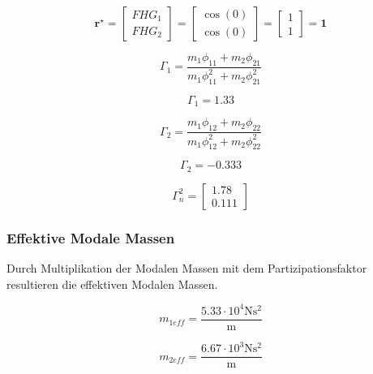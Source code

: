 \documentclass[
  letterpaper,
  DIV=11]{scrreprt}
\begin{document}
\[\mathbf{r^\star} = \begin{bmatrix}
FHG_1 \\
FHG_2 
\end{bmatrix}=
\begin{bmatrix}
\cos(0) \\
\cos(0) 
\end{bmatrix}=
\begin{bmatrix}
1 \\
1 
\end{bmatrix}= \mathbf{1}\]

\begin{equation*}\Gamma_{1} = \frac{m_{1} \phi_{11} + m_{2} \phi_{21}}{m_{1} \phi_{11}^{2} + m_{2} \phi_{21}^{2}}\end{equation*}

\begin{equation*}\Gamma_{1} = 1.33\end{equation*}

\begin{equation*}\Gamma_{2} = \frac{m_{1} \phi_{12} + m_{2} \phi_{22}}{m_{1} \phi_{12}^{2} + m_{2} \phi_{22}^{2}}\end{equation*}

\begin{equation*}\Gamma_{2} = -0.333\end{equation*}

\begin{equation*}\Gamma^{2}_{n} = \left[\begin{matrix}1.78\\0.111\end{matrix}\right]\end{equation*}

\hypertarget{effektive-modale-massen}{%
\subsubsection{Effektive Modale Massen}\label{effektive-modale-massen}}

Durch Multiplikation der Modalen Massen mit dem Partizipationsfaktor
resultieren die effektiven Modalen Massen.

\begin{equation*}m_{1eff} = \frac{5.33 \cdot 10^{4} \text{N} \text{s}^{2}}{\text{m}}\end{equation*}

\begin{equation*}m_{2eff} = \frac{6.67 \cdot 10^{3} \text{N} \text{s}^{2}}{\text{m}}\end{equation*}
\end{document}
